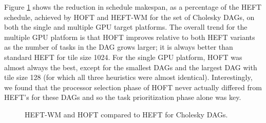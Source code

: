 \documentclass[runningheads]{llncs}
\begin{document}
Figure \ref{plot.hoft_cholesky} shows the reduction in schedule makespan, as a percentage of the HEFT schedule, achieved by HOFT and HEFT-WM for the set of Cholesky DAGs, on both the single and multiple GPU target platforms. The overall trend for the multiple GPU platform is that HOFT improves relative to both HEFT variants as the number of tasks in the DAG grows larger; it is always better than standard HEFT for tile size 1024. For the single GPU platform, HOFT was almost always the best, except for the smallest DAGs and the largest DAG with tile size 128 (for which all three heuristics were almost identical). Interestingly, we found that the processor selection phase of HOFT never actually differed from HEFT's for these DAGs and so the task prioritization phase alone was key. 
\begin{figure}
	\centering	
	\caption{HEFT-WM and HOFT compared to HEFT for Cholesky DAGs.}	
	\label{plot.hoft_cholesky}
\end{figure} 
\end{document}
